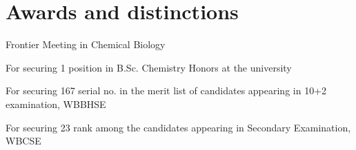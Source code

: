 \section{Awards and distinctions}



           {Frontier Meeting in Chemical Biology}


           {For securing 1 position in B.Sc. Chemistry Honors at the university}


           {For securing 167 serial no. in the merit list of candidates appearing in 10+2 examination, WBBHSE}

           {For securing 23 rank among the candidates appearing in Secondary Examination, WBCSE}
